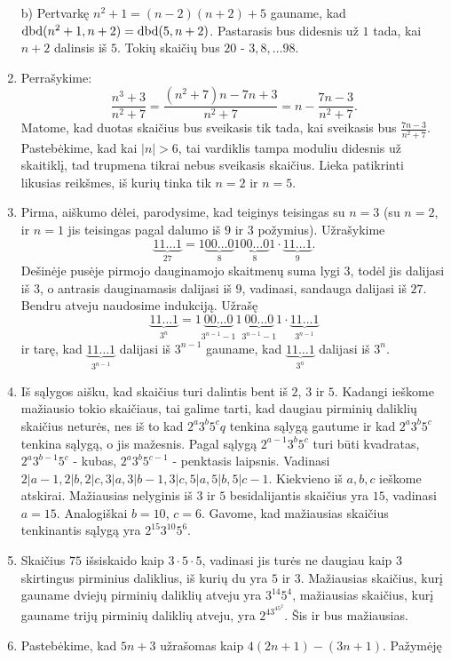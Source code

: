 \begin{enumerate}
b) Pertvarkę $n^2 + 1 = (n-2)(n+2) +5$ gauname, kad $\operatorname{dbd}(n^2 + 1,
n+2) = \operatorname{dbd}(5,n+2)$. Pastarasis bus didesnis už $1$ tada, kai
$n+2$ dalinsis iš $5$. Tokių skaičių bus $20$ - $3, 8, \dots 98$.
\item 
Perrašykime: $$\frac{n^3+3}{n^2+7} = \frac{(n^2+7)n - 7n + 3}{n^2+7} =
n - \frac{7n-3}{n^2+7}.$$
Matome, kad duotas skaičius bus sveikasis tik tada, kai sveikasis bus
$\frac{7n-3}{n^2+7}.$ Pastebėkime, kad kai $|n|>6$, tai vardiklis tampa
moduliu didesnis už skaitiklį, tad trupmena tikrai nebus sveikasis
skaičius. Lieka patikrinti likusias reikšmes, iš kurių tinka tik
$n=2$ ir $n=5$.
\item 
Pirma, aiškumo dėlei, parodysime, kad teiginys teisingas su $n=3$
(su $n=2$, ir $n=1$ jis teisingas pagal dalumo iš $9$ ir $3$
požymius). Užrašykime $$\underbrace{11\ldots1}_{27} =
1\underbrace{00\ldots0}_{8}1\underbrace{00\ldots0}_{8}1\cdot
\underbrace{11\ldots1}_{9}.$$ Dešinėje pusėje pirmojo dauginamojo
skaitmenų suma lygi $3$, todėl jis dalijasi iš $3$, o antrasis
dauginamasis dalijasi iš $9$, vadinasi, sandauga dalijasi iš $27$.
Bendru atveju naudosime indukciją. Užrašę
$$\underbrace{11\ldots1}_{3^n} =
1\underbrace{00\ldots0}_{3^{n-1}
-1}1\underbrace{00\ldots0}_{3^{n-1}-1}1\cdot
\underbrace{11\ldots1}_{3^{n-1}}$$ ir tarę, kad
$\underbrace{11\ldots1}_{3^{n-1}}$ dalijasi iš $3^{n-1}$ gauname, kad
$\underbrace{11\ldots1}_{3^{n}}$ dalijasi iš $3^{n}$.
\item 
Iš sąlygos aišku, kad skaičius turi dalintis bent iš $2$, $3$ ir
$5$. Kadangi ieškome mažiausio tokio skaičiaus, tai galime tarti, kad
daugiau pirminių daliklių skaičius neturės, nes iš to kad $2^a3^b5^cq$
tenkina sąlygą gautume ir kad $2^a3^b5^c$ tenkina sąlygą, o jis
mažesnis. Pagal sąlygą $2^{a-1}3^b5^c$ turi būti kvadratas,
$2^a3^{b-1}5^c$ - kubas, $2^a3^b5^{c-1}$ - penktasis laipsnis.
Vadinasi $2|a-1, 2|b, 2|c, 3|a, 3|b-1, 3|c, 5|a, 5|b, 5|c-1$.
Kiekvieno iš $a,b,c$ ieškome atskirai. Mažiausias nelyginis iš
$3$ ir $5$ besidalijantis skaičius yra $15$, vadinasi $a=15$.
Analogiškai $b=10$, $c=6$. Gavome, kad mažiausias skaičius tenkinantis
sąlygą yra $2^{15}3^{10}5^6$.
\item 
Skaičius $75$ išsiskaido kaip $3\cdot 5\cdot5$, vadinasi jis turės ne
daugiau kaip $3$ skirtingus pirminius daliklius, iš kurių du yra
$5$ ir $3$. Mažiausias skaičius, kurį gauname dviejų pirminių daliklių
atveju yra $3^{14}5^4$, mažiausias skaičius, kurį gauname trijų
pirminių daliklių atveju, yra $2^43^45^2$. Šis ir bus mažiausias.
\item 
Pastebėkime, kad $5n+3$ užrašomas kaip $4(2n + 1) - (3n+1)$. Pažymėję

\end{enumerate}

